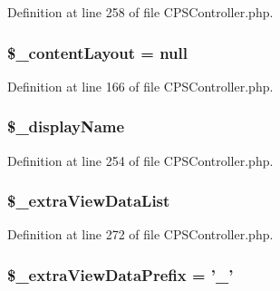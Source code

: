 Definition at line 258 of file CPSController.php.

\hypertarget{classCPSController_a563111c63fb9315722e30c4798e1edf7}{
\subsubsection[{\$\_\-contentLayout}]{\setlength{\rightskip}{0pt plus 5cm}\$\_\-contentLayout = null}}
\label{classCPSController_a563111c63fb9315722e30c4798e1edf7}


Definition at line 166 of file CPSController.php.

\hypertarget{classCPSController_a888e2769fd7505af5c103a238c06b363}{
\subsubsection[{\$\_\-displayName}]{\setlength{\rightskip}{0pt plus 5cm}\$\_\-displayName}}
\label{classCPSController_a888e2769fd7505af5c103a238c06b363}


Definition at line 254 of file CPSController.php.

\hypertarget{classCPSController_a7d16c40c2d533779317b383d69e59ea0}{
\subsubsection[{\$\_\-extraViewDataList}]{\setlength{\rightskip}{0pt plus 5cm}\$\_\-extraViewDataList}}
\label{classCPSController_a7d16c40c2d533779317b383d69e59ea0}


Definition at line 272 of file CPSController.php.

\hypertarget{classCPSController_a41793f2872b496a2d4effc0da5f82a3c}{
\subsubsection[{\$\_\-extraViewDataPrefix}]{\setlength{\rightskip}{0pt plus 5cm}\$\_\-extraViewDataPrefix = '\_\-'}}
\label{classCPSController_a41793f2872b496a2d4effc0da5f82a3c}


